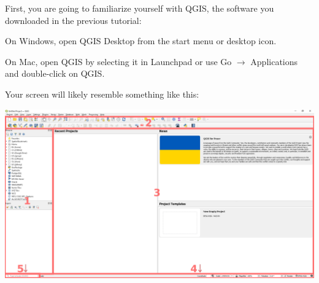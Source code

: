 \documentclass[oneside,a4paper,11pt,explicit]{book}
\begin{document}
First, you are going to familiarize yourself with QGIS, the software you downloaded in the previous tutorial:

On Windows, open QGIS Desktop from the start menu or desktop icon. 

On Mac, open QGIS by selecting it in Launchpad or use Go $\rightarrow$ Applications and double-click on QGIS.

Your screen will likely resemble something like this:

\centerline{\includegraphics[width=\textwidth]{QGISscreen.png}}
\end{document}

